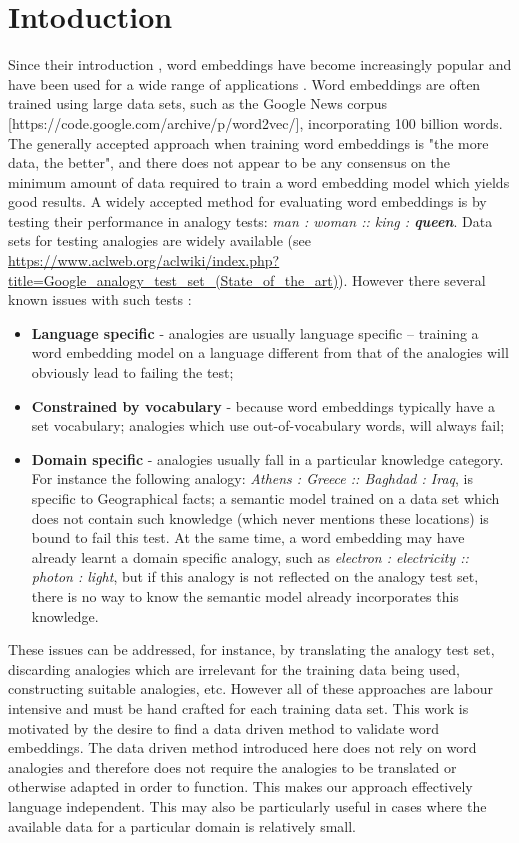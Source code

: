 \documentclass{article} %
\begin{document}
\section{Intoduction}
\label{sec:introduction}
Since their introduction \cite{Mikolov_CS2013}, word embeddings have become increasingly popular and have been used for a wide range of applications \cite{Mikolov_CoRR2013, Kim_CoRR2014, Levy_CNLL2014, Cordeiro_ACL2016, Smith_ICLR2017}. Word embeddings are often trained using large data sets, such as the Google News corpus [https://code.google.com/archive/p/word2vec/], incorporating 100 billion words. The generally accepted approach when training word embeddings is "the more data, the better", and there does not appear to be any consensus on the minimum amount of data required to train a word embedding model which yields good results. A widely accepted method for evaluating word embeddings is by testing their performance in analogy tests: \textit{man : woman :: king : \textbf{queen}}. Data sets for testing analogies are widely available (see 
\url{https://www.aclweb.org/aclwiki/index.php?title=Google_analogy_test_set_(State_of_the_art)}). However there several known issues with such tests \cite{Speer_Blog2016}:

\begin{itemize}
 \item \textbf{Language specific} - analogies are usually language specific -- training a word embedding model on a language different from that of the analogies will obviously lead to failing the test;
 \item \textbf{Constrained by vocabulary} - because word embeddings typically have a set vocabulary; analogies which use out-of-vocabulary words, will always fail;
 \item \textbf{Domain specific} - analogies usually fall in a particular knowledge category. For instance the following analogy: \textit{Athens : Greece :: Baghdad : Iraq}, is specific to Geographical facts; a semantic model trained on a data set which does not contain such knowledge (which never mentions these locations) is bound to fail this test. At the same time, a word embedding may have already learnt a domain specific analogy, such as \textit{electron : electricity :: photon : light}, but if this analogy is not reflected on the analogy test set, there is no way to know the semantic model already incorporates this knowledge.
\end{itemize}

These issues can be addressed, for instance, by translating the analogy test set, discarding analogies which are irrelevant for the training data being used, constructing suitable analogies, etc. However all of these approaches are labour intensive and must be hand crafted for each training data set. This work is motivated by the desire to find a data driven method to validate word embeddings. The data driven method introduced here does not rely on word analogies and therefore does not require the analogies to be translated or otherwise adapted in order to function. This makes our approach effectively language independent. This may also be particularly useful in cases where the available data for a particular domain is relatively small.
\end{document}
